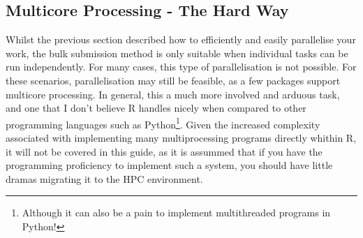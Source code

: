 \subsection{Multicore Processing - The Hard Way}
Whilst the previous section described how to efficiently and easily parallelise your work, the bulk submission method is only suitable when individual tasks can be run independently. For many cases, this type of parallelisation is not possible. For these scenarios, parallelisation may still be feasible, as a few packages support multicore processing. In general, this a much more involved and arduous task, and one that I don't believe R handles nicely when compared to other programming languages such as Python\footnote{Although it can also be a pain to implement multithreaded programs in Python!}. Given the increased complexity associated with implementing many multiprocessing programs directly whithin R, it will not be covered in this guide, as it is assummed that if you have the programming proficiency to implement such a system, you should have little dramas migrating it to the HPC environment.



